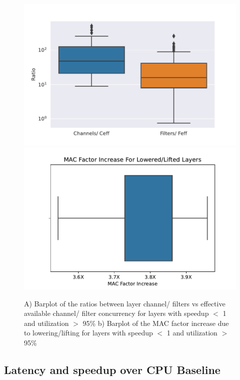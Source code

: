 \begin{figure}
    \centering
    \includegraphics[scale=0.48]{Plots/utilization/ratios.pdf}
    \hspace{0.1cm} 
    \includegraphics[scale=0.48]{Plots/utilization/macs.pdf}
    \caption{A) Barplot of the ratios between layer channel/ filters vs effective available channel/ filter concurrency for layers with speedup $<$ 1 and utilization $>$ 95\% b) Barplot of the MAC factor increase due to lowering/lifting for layers with speedup $<$ 1 and utilization $>$ 95\%}
    \label{fig:mac_ratios}
\end{figure}

\subsection{Latency and speedup over CPU Baseline}
\label{chap:hero:results:latency}

